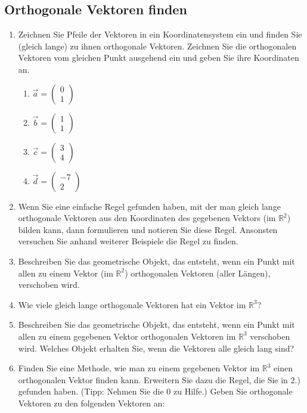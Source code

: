 \documentclass[12pt,a4paper,twoside,fleqn]{article}
\begin{document}
\subsection{Orthogonale Vektoren finden}
\begin{enumerate}
\item Zeichnen Sie Pfeile der Vektoren in ein Koordinatensystem ein und
  finden Sie (gleich lange) zu ihnen orthogonale Vektoren. Zeichnen
  Sie die orthogonalen Vektoren vom gleichen Punkt ausgehend ein und
  geben Sie ihre Koordinaten an. 

  \begin{multicols}{4}
    \begin{enumerate}
    \item $\vec{a}=  
      \begin{pmatrix}
        0\\1
      \end{pmatrix}
      $
    \item $\vec{b}=  
      \begin{pmatrix}
        1\\1
      \end{pmatrix}
      $
    \item $\vec{c}=  
      \begin{pmatrix}
        3\\4
      \end{pmatrix}
      $
    \item $\vec{d}=  
      \begin{pmatrix}
        -7\\2
      \end{pmatrix}
      $
    \end{enumerate}
  \end{multicols}
\item Wenn Sie eine einfache Regel gefunden haben, mit der man gleich lange
  orthogonale Vektoren aus den Koordinaten des gegebenen Vektors  (im
  $\mathbb{R}^2$) bilden
  kann, dann formulieren und notieren Sie diese
  Regel. Ansonsten  versuchen Sie anhand weiterer Beispiele die Regel zu
  finden.
\item Beschreiben Sie das geometrische Objekt, das entsteht, wenn ein
  Punkt mit allen zu einem Vektor (im $\mathbb{R}^2$)  orthogonalen
  Vektoren (aller Längen), verschoben wird. 
\item Wie viele gleich
  lange orthogonale Vektoren hat ein Vektor im $\mathbb{R}^3$?
\item Beschreiben Sie das geometrische Objekt, das entsteht, wenn ein
  Punkt mit allen zu einem gegebenen Vektor orthogonalen Vektoren im
  $\mathbb{R}^3$ verschoben wird. Welches Objekt erhalten Sie, wenn
  die Vektoren alle gleich lang sind?
\item Finden Sie eine Methode, wie man zu einem gegebenen Vektor im
  $\mathbb{R}^3$ einen orthogonalen Vektor finden kann. Erweitern Sie
  dazu die Regel, die Sie in 2.) gefunden haben. (Tipp: Nehmen Sie die
  0 zu Hilfe.) Geben Sie orthogonale Vektoren zu den folgenden
  Vektoren an:
  

\end{enumerate}
\end{document}
